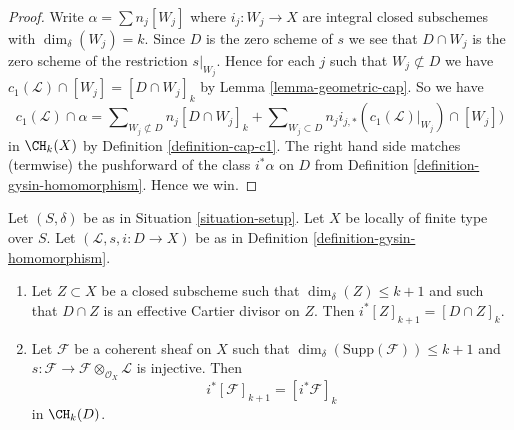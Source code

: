 \begin{proof}
Write $\alpha = \sum n_j[W_j]$ where $i_j : W_j \to X$ are integral closed
subschemes with $\dim_\delta(W_j) = k$.
Since $D$ is the zero scheme of $s$ we see that $D \cap W_j$ is the zero scheme
of the restriction $s|_{W_j}$. Hence for each $j$ such that
$W_j \not \subset D$ we have
$c_1(\mathcal{L}) \cap [W_j] = [D \cap W_j]_k$
by Lemma \ref{lemma-geometric-cap}. So we have
$$
c_1(\mathcal{L}) \cap \alpha
=
\sum\nolimits_{W_j \not \subset D} n_j[D \cap W_j]_k
+
\sum\nolimits_{W_j \subset D}
n_j i_{j, *}(c_1(\mathcal{L})|_{W_j}) \cap [W_j])
$$
in $\CH_k(X)$ by Definition \ref{definition-cap-c1}.
The right hand side matches (termwise) the pushforward of the class
$i^*\alpha$ on $D$ from Definition \ref{definition-gysin-homomorphism}.
Hence we win.
\end{proof}

\begin{lemma}
\label{lemma-easy-gysin}
Let $(S, \delta)$ be as in Situation \ref{situation-setup}.
Let $X$ be locally of finite type over $S$.
Let $(\mathcal{L}, s, i : D \to X)$ be as in
Definition \ref{definition-gysin-homomorphism}.
\begin{enumerate}
\item Let $Z \subset X$ be a closed subscheme such
that $\dim_\delta(Z) \leq k + 1$ and such that
$D \cap Z$ is an effective Cartier divisor on $Z$. Then
$i^*[Z]_{k + 1} = [D \cap Z]_k$.
\item Let $\mathcal{F}$ be a coherent sheaf on $X$
such that $\dim_\delta(\text{Supp}(\mathcal{F})) \leq k + 1$ and
$s : \mathcal{F} \to \mathcal{F} \otimes_{\mathcal{O}_X} \mathcal{L}$
is injective. Then
$$
i^*[\mathcal{F}]_{k + 1} = [i^*\mathcal{F}]_k
$$
in $\CH_k(D)$.
\end{enumerate}
\end{lemma}

